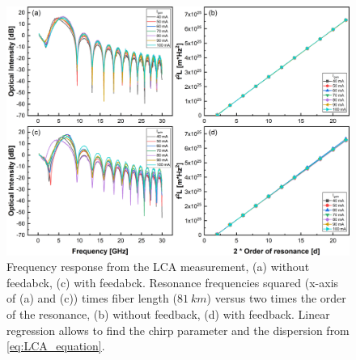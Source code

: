 \begin{figure}[ht]
    \centering
    \includegraphics[width=\linewidth]{figures/chirp_cleaved_and_lensed_4679.png}
    \caption{Frequency response from the LCA measurement, (a) without feedabck, (c) with feedabck. Resonance frequencies squared (x-axis of (a) and (c)) times fiber length ($81 \ km$) versus two times the order of the resonance, (b) without feedback, (d) with feedback. Linear regression allows to find the chirp parameter and the dispersion from \autoref{eq:LCA_equation}.}
    \label{fig:chirp_cleaved_and_lensed}
\end{figure}


